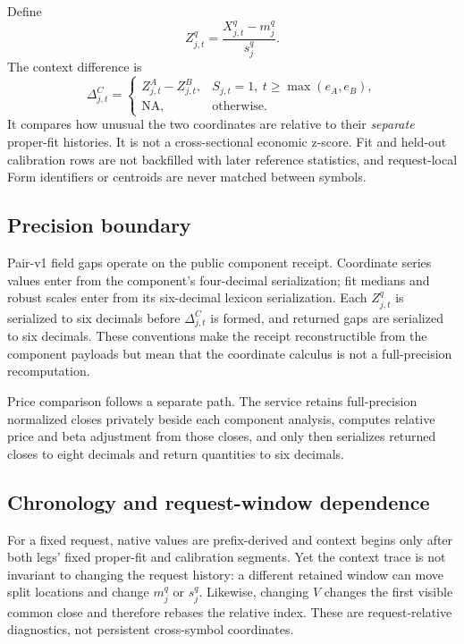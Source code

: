 \documentclass{article}
\newcommand{\NA}{\mathrm{NA}}
\begin{document}
Define
\begin{equation}
Z^q_{j,t}=\frac{X^q_{j,t}-m^q_j}{s^q_j}.
\label{eq:z}
\end{equation}
The context difference is
\begin{equation}
\Delta^{C}_{j,t}=
\begin{cases}
Z^A_{j,t}-Z^B_{j,t},
& S_{j,t}=1,\ t\ge\max(e_A,e_B),\\
\NA,&\text{otherwise}.
\end{cases}
\label{eq:context}
\end{equation}
It compares how unusual the two coordinates are relative to their \emph{separate} proper-fit histories. It is not a cross-sectional economic z-score. Fit and held-out calibration rows are not backfilled with later reference statistics, and request-local Form identifiers or centroids are never matched between symbols.

\subsection{Precision boundary}

Pair-v1 field gaps operate on the public component receipt. Coordinate series values enter from the component's four-decimal serialization; fit medians and robust scales enter from its six-decimal lexicon serialization. Each $Z^q_{j,t}$ is serialized to six decimals before $\Delta^C_{j,t}$ is formed, and returned gaps are serialized to six decimals. These conventions make the receipt reconstructible from the component payloads but mean that the coordinate calculus is not a full-precision recomputation.

Price comparison follows a separate path. The service retains full-precision normalized closes privately beside each component analysis, computes relative price and beta adjustment from those closes, and only then serializes returned closes to eight decimals and return quantities to six decimals.

\subsection{Chronology and request-window dependence}

For a fixed request, native values are prefix-derived and context begins only after both legs' fixed proper-fit and calibration segments. Yet the context trace is not invariant to changing the request history: a different retained window can move split locations and change $m^q_j$ or $s^q_j$. Likewise, changing $V$ changes the first visible common close and therefore rebases the relative index. These are request-relative diagnostics, not persistent cross-symbol coordinates.
\end{document}
